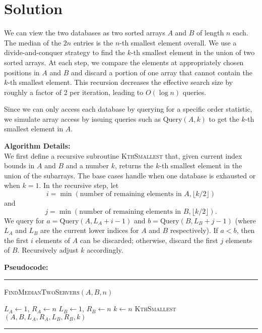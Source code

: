 \documentclass[11pt]{article}
\begin{document}
    \section*{Solution}
    We can view the two databases as two sorted arrays \( A \) and \( B \) of length \( n \) each. 
    The median of the \( 2n \) entries is the \( n \)-th smallest element overall. 
    We use a divide-and-conquer strategy to find the \( k \)-th smallest element in the union of two sorted arrays.
    At each step, we compare the elements at appropriately chosen positions in \( A \) and \( B \) and discard a portion of one array that cannot contain the \( k \)-th smallest element. This recursion decreases the effective search size by roughly a factor of 2 per iteration, leading to \( O(\log n) \) queries.
    
    Since we can only access each database by querying for a specific order statistic, we simulate array access by issuing queries such as \(\text{Query}(A, k)\) to get the \( k \)-th smallest element in \( A \).
    
    \bigskip
    
    \textbf{Algorithm Details:} \\
    We first define a recursive subroutine \textsc{KthSmallest} that, given current index bounds in \( A \) and \( B \) and a number \( k \), returns the \( k \)-th smallest element in the union of the subarrays. The base cases handle when one database is exhausted or when \( k = 1 \). In the recursive step, let
    \[
    i = \min(\text{number of remaining elements in } A, \lfloor k/2 \rfloor)
    \]
    and
    \[
    j = \min(\text{number of remaining elements in } B, \lfloor k/2 \rfloor).
    \]
    We query for \( a = \text{Query}(A, L_A+i-1) \) and \( b = \text{Query}(B, L_B+j-1) \) (where \( L_A \) and \( L_B \) are the current lower indices for \( A \) and \( B \) respectively). If \( a < b \), then the first \( i \) elements of \( A \) can be discarded; otherwise, discard the first \( j \) elements of \( B \). Recursively adjust \( k \) accordingly.
    
    \bigskip
    
    \textbf{Pseudocode:}
    
    \par\noindent\rule{\textwidth}{0.4pt}
    \smallskip        
    \textsc{FindMedianTwoServers}$(A, B, n)$
    \begin{algorithmic}[1]
        \STATE $L_A \gets 1$, $R_A \gets n$
        \STATE $L_B \gets 1$, $R_B \gets n$
        \STATE $k \gets n$
        \RETURN \textsc{KthSmallest}$(A, B, L_A, R_A, L_B, R_B, k)$
    \end{algorithmic}
    \vspace{-2mm}
    \par\noindent\rule{\textwidth}{0.4pt}
    
\end{document}
